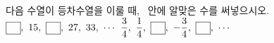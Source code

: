 다음 수열이 등차수열을 이룰 때, \blank\ 안에 알맞은 수를 \mbox{써넣으시오.}
 $\blank,\ 15,\ \blank,\ 27,\ 33,\ \cdots$
 $\dfrac{3}{4},\ \dfrac{1}{4},\ \blank,\ -\dfrac{3}{4},\ \blank,\ \cdots$
